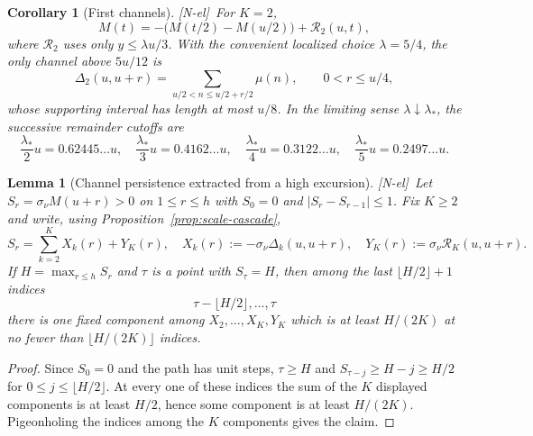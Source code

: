 \documentclass[11pt,reqno]{amsart}
\numberwithin{equation}{section}
\theoremstyle{plain}
\newtheorem{lemma}[theorem]{Lemma}
\newtheorem{corollary}[theorem]{Corollary}
\theoremstyle{definition}
\theoremstyle{remark}
\newcommand{\tagNE}{\textup{[N-el]}}
\begin{document}
\begin{corollary}[First channels]
\label{cor:first-channels}
\tagNE\ For $K=2$,
\begin{equation}
M(t)=-\bigl(M(t/2)-M(u/2)\bigr)+\mathcal R_2(u,t),
\end{equation}
where $\mathcal R_2$ uses only $y\le\lambda u/3$.  With the convenient localized
choice $\lambda=5/4$, the only channel above $5u/12$ is
\begin{equation}
\Delta_2(u,u+r)=\sum_{u/2<n\le u/2+r/2}\mu(n),
\qquad 0<r\le u/4,
\end{equation}
whose supporting interval has length at most $u/8$.  In the limiting
sense $\lambda\downarrow\lambda_*$, the successive remainder cutoffs are
\begin{equation}
\frac{\lambda_*}{2}u=0.62445\ldots u,\quad
\frac{\lambda_*}{3}u=0.4162\ldots u,\quad
\frac{\lambda_*}{4}u=0.3122\ldots u,\quad
\frac{\lambda_*}{5}u=0.2497\ldots u.
\end{equation}
\end{corollary}

\begin{lemma}[Channel persistence extracted from a high excursion]
\label{lem:channel-persistence}
\tagNE\ Let $S_r=\sigma_\nu M(u+r)>0$ on $1\le r\le h$ with $S_0=0$ and
$|S_r-S_{r-1}|\le1$.  Fix $K\ge2$ and write, using
Proposition~\ref{prop:scale-cascade},
\begin{equation}
S_r=\sum_{k=2}^{K}X_k(r)+Y_K(r),
\quad
X_k(r):=-\sigma_\nu\Delta_k(u,u+r),
\quad
Y_K(r):=\sigma_\nu \mathcal R_K(u,u+r).
\end{equation}
If $H=\max_{r\le h}S_r$ and $\tau$ is a point with $S_\tau=H$, then among
the last $\lfloor H/2\rfloor+1$ indices
\begin{equation}
\tau-\lfloor H/2\rfloor,\ldots,\tau
\end{equation}
there is one fixed component among
$X_2,\ldots,X_K,Y_K$ which is at least $H/(2K)$ at no fewer than
$\lfloor H/(2K)\rfloor$ indices.
\end{lemma}

\begin{proof}
Since $S_0=0$ and the path has unit steps, $\tau\ge H$ and
$S_{\tau-j}\ge H-j\ge H/2$ for
$0\le j\le\lfloor H/2\rfloor$.  At every one of these indices the sum of
the $K$ displayed components is at least $H/2$, hence some component is at
least $H/(2K)$.  Pigeonholing the indices among the $K$ components gives the
claim.
\end{proof}
\end{document}
